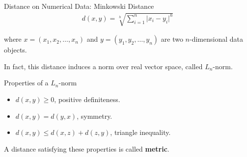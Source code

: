 \begin{frame}{Distance on Numerical Data: Minkowski Distance}
	\vspace{-1.5em}
	\begin{align*}
		d(x,y) = \sqrt[h]{\sum_{i=1}^{n} \vert x_i-y_i \vert^h}
	\end{align*}

	where $x = (x_1,x_2, \ldots, x_n)$ and $y = (y_1,y_2,\ldots,y_n)$ are two $n$-dimensional data objects.

	In fact, this distance induces a norm over real vector space, called $L_n$-norm.

	\begin{block}{Properties of a $L_n$-norm}
		\begin{itemize}
			\item $d(x,y) \geq 0$, positive definiteness.
			\item $d(x,y) = d(y,x)$, symmetry.
			\item $d(x,y) \leq d(x,z) + d(z,y)$, triangle inequality.
		\end{itemize}

		A distance satisfying these properties is called \textbf{metric}.
	\end{block}
\end{frame}

